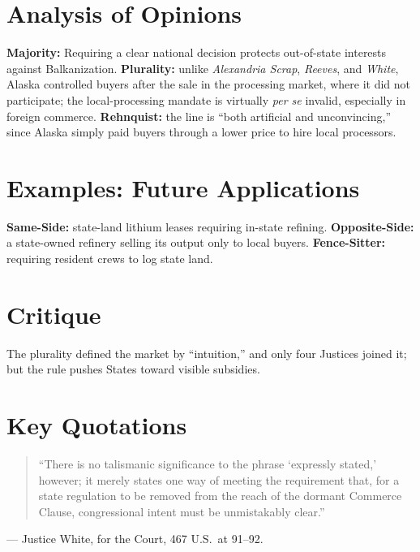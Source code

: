 \documentclass[12pt]{article}
\begin{document}
\section{Analysis of Opinions}
\textbf{Majority:} Requiring a clear national decision protects out-of-state interests against Balkanization. \textbf{Plurality:} unlike \textit{Alexandria Scrap}, \textit{Reeves}, and \textit{White}, Alaska controlled buyers after the sale in the processing market, where it did not participate; the local-processing mandate is virtually \textit{per se} invalid, especially in foreign commerce. \textbf{Rehnquist:} the line is ``both artificial and unconvincing,'' since Alaska simply paid buyers through a lower price to hire local processors.

\section{Examples: Future Applications}
\textbf{Same-Side:} state-land lithium leases requiring in-state refining. \textbf{Opposite-Side:} a state-owned refinery selling its output only to local buyers. \textbf{Fence-Sitter:} requiring resident crews to log state land.

\section{Critique}
The plurality defined the market by ``intuition,'' and only four Justices joined it; but the rule pushes States toward visible subsidies.

\section{Key Quotations}
\begin{quote}
``There is no talismanic significance to the phrase `expressly stated,' however; it merely states one way of meeting the requirement that, for a state regulation to be removed from the reach of the dormant Commerce Clause, congressional intent must be unmistakably clear.''
\end{quote}
\noindent --- Justice White, for the Court, 467 U.S.\ at 91--92.
\end{document}
